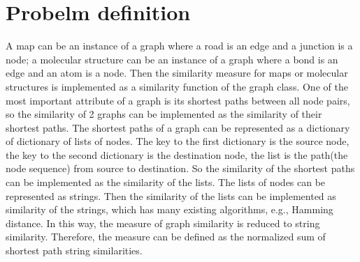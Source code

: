 \documentclass{article}
\begin{document}
\section{Probelm definition}
A map can be an instance of a graph where a road is an edge and a junction is
a node; a molecular structure can be an instance of a graph where a bond is
an edge and an atom is a node. Then the similarity measure for maps or molecular
structures is implemented as a similarity function of the graph class. One of
the most important attribute of a graph is its shortest paths between all node
pairs, so the similarity of 2 graphs can be implemented as the similarity of
their shortest paths. The shortest paths of a graph can be represented as a
dictionary of dictionary of lists of nodes. The key to the first dictionary is
the source node, the key to the second dictionary is the destination node, the
list is the path(the node sequence) from source to destination. So the
similarity of the shortest paths can be implemented as the similarity of the
lists. The lists of nodes can be represented as strings. Then the similarity of
the lists can be implemented as similarity of the strings, which has many
existing algorithms, e.g., Hamming distance. In this way, the measure of graph
similarity is reduced to string similarity. Therefore, the measure can be
defined as the normalized sum of shortest path string similarities.
\end{document}
